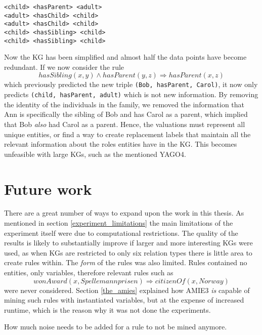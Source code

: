 \begin{example}
\begin{lstlisting}[]
<child> <hasParent> <adult>
<adult> <hasChild> <child>
<adult> <hasChild> <child>
<child> <hasSibling> <child>
<child> <hasSibling> <child>
\end{lstlisting}
\label{mini_simple_KG_rules}
\end{example}

Now the KG has been simplified and almost half the data points have become redundant. If we now consider the rule \[hasSibling(x, y) \wedge hasParent(y,z) \Rightarrow hasParent(x,z)\] which previously predicted the new triple \texttt{(Bob, hasParent, Carol)}, it now only predicts \texttt{(child, hasParent, adult)} which is not new information. By removing the identity of the individuals in the family, we removed the information that Ann is specifically the sibling of Bob and has Carol as a parent, which implied that Bob \textit{also} had Carol as a parent. Hence, the valuations must represent all unique entities, or find a way to create replacement labels that maintain all the relevant information about the roles entities have in the KG. This becomes unfeasible with large KGs, such as the mentioned YAGO4.

\section{Future work}
There are a great number of ways to expand upon the work in this thesis. As mentioned in section \ref{experiment_limitations} the main limitations of the experiment itself were due to computational restrictions. The quality of the results is likely to substantially improve if larger and more interesting KGs were used, as when KGs are restricted to only six relation types there is little area to create rules within. The \textit{form} of the rules was also limited. Rules contained no entities, only variables, therefore relevant rules such as
\[wonAward(x, Spellemannprisen) \Rightarrow citizenOf(x, Norway)\]
were never considered. Section \ref{the_amies} explained how AMIE3 \textit{is} capable of mining such rules with instantiated variables, but at the expense of increased runtime, which is the reason why it was not done the experiments.



How much noise needs to be added for a rule to not be mined anymore.